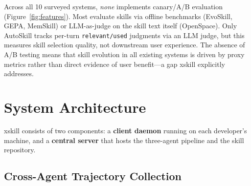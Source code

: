 \documentclass[11pt]{article}
\begin{document}
Across all 10 surveyed systems, \emph{none} implements canary/A/B evaluation (Figure~\ref{fig:features}). Most evaluate skills via offline benchmarks (EvoSkill, GEPA, MemSkill) or LLM-as-judge on the skill text itself (OpenSpace). Only AutoSkill tracks per-turn \texttt{relevant/used} judgments via an LLM judge, but this measures skill selection quality, not downstream user experience. The absence of A/B testing means that skill evolution in all existing systems is driven by proxy metrics rather than direct evidence of user benefit---a gap xskill explicitly addresses.


\section{System Architecture}
\label{sec:architecture}

xskill consists of two components: a \textbf{client daemon} running on each developer's machine, and a \textbf{central server} that hosts the three-agent pipeline and the skill repository.

\subsection{Cross-Agent Trajectory Collection}
\label{sec:collection}
\end{document}
